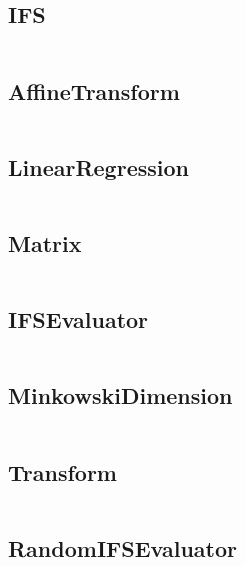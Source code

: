 \documentclass{article}
\begin{document}
\begin{appendices}
  \subsection{IFS}
  \inputminted{java}{/home/marcus/grive/codedungeon/jifs/src/IFS.java}
  
  \subsection{AffineTransform}
  \inputminted{java}{/home/marcus/grive/codedungeon/jifs/src/AffineTransform.java}
  
  \subsection{LinearRegression}
  \inputminted{java}{/home/marcus/grive/codedungeon/jifs/src/LinearRegression.java}
  
  \subsection{Matrix}
  \inputminted{java}{/home/marcus/grive/codedungeon/jifs/src/Matrix.java}
  
  \subsection{IFSEvaluator}
  \inputminted{java}{/home/marcus/grive/codedungeon/jifs/src/IFSEvaluator.java}
  
  \subsection{MinkowskiDimension}
  \inputminted{java}{/home/marcus/grive/codedungeon/jifs/src/MinkowskiDimension.java}
  
  \subsection{Transform}
  \inputminted{java}{/home/marcus/grive/codedungeon/jifs/src/Transform.java}
  
  \subsection{RandomIFSEvaluator}
  \inputminted{java}{/home/marcus/grive/codedungeon/jifs/src/RandomIFSEvaluator.java}
  
\end{appendices}
\end{document}
